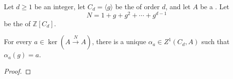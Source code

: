 \begin{lemma} \label{lemma:first_cocycles_of_a_cyclic_group_with_values_in_a_module_are_determined_by_value_at_generator}
    Let $d \geq 1$ be an integer, let $C_d = \langle g \rangle$ be the  of order $d$, and let $A$ be a . Let
    $$N = 1 + g + g^2 + \cdots + g^{d-1}$$
    be the  of $\mathbb{Z}[C_d]$.

    For every $a \in \ker(A \xrightarrow{N} A)$, there is a unique $\alpha_a \in Z^1(C_d,A)$ such that $\alpha_a(g) = a$.
\end{lemma}
\begin{proof}

\end{proof}